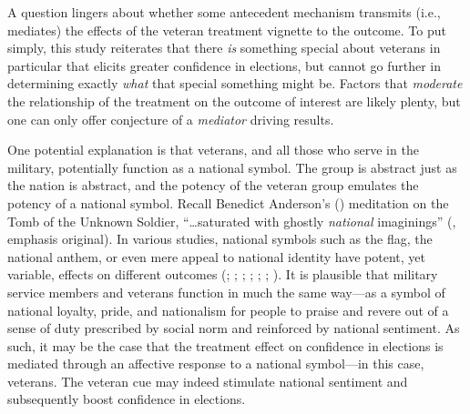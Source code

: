 \documentclass[
  12pt,
  letterpaper,
]{article}
\begin{document}
A question lingers about whether some antecedent mechanism transmits
(i.e., mediates) the effects of the veteran treatment vignette to the
outcome. To put simply, this study reiterates that there \emph{is}
something special about veterans in particular that elicits greater
confidence in elections, but cannot go further in determining exactly
\emph{what} that special something might be. Factors that
\emph{moderate} the relationship of the treatment on the outcome of
interest are likely plenty, but one can only offer conjecture of a
\emph{mediator} driving results.

One potential explanation is that veterans, and all those who serve in
the military, potentially function as a national symbol. The group is
abstract just as the nation is abstract, and the potency of the veteran
group emulates the potency of a national symbol. Recall Benedict
Anderson's () meditation on the Tomb of
the Unknown Soldier, ``\ldots saturated with ghostly \emph{national}
imaginings'' (, emphasis original).
In various studies, national symbols such as the flag, the national
anthem, or even mere appeal to national identity have potent, yet
variable, effects on different outcomes (; ;
;
;
;
;
). It is plausible that
military service members and veterans function in much the same way---as
a symbol of national loyalty, pride, and nationalism for people to
praise and revere out of a sense of duty prescribed by social norm and
reinforced by national sentiment. As such, it may be the case that the
treatment effect on confidence in elections is mediated through an
affective response to a national symbol---in this case, veterans. The
veteran cue may indeed stimulate national sentiment and subsequently
boost confidence in elections.
\end{document}

